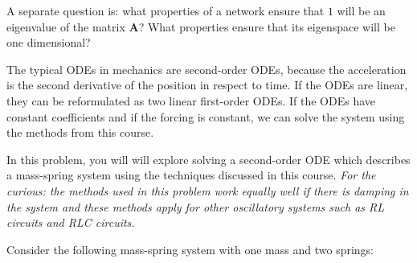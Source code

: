 \documentclass[10pt,answers]{exam}
\newcommand{\bA}{ \mathbf{A}}
\begin{document}
\begin{questions}
\begin{EnvUplevel}
  A separate question is: what properties of a network ensure that $1$ will be
  an eigenvalue of the matrix $\bA$?  What properties ensure that its eigenspace
  will be one dimensional?

\end{EnvUplevel}
  
\newpage 
     
\question \label{question:ODE} The typical ODEs in mechanics are second-order
ODEs, because the acceleration is the second derivative of the position in
respect to time. If the ODEs are linear, they can be reformulated as two linear
first-order ODEs.  If the ODEs have constant coefficients and if the forcing is
constant, we can solve the system using the methods from this course.
  
In this problem, you will will explore solving a second-order ODE which
describes a mass-spring system using the techniques discussed in this course.
\textit{For the curious: the methods used in this problem work equally well if
  there is damping in the system and these methods apply for other oscillatory
  systems such as RL circuits and RLC circuits.}

Consider the following mass-spring system with one mass and two springs:
\bigskip
  

\end{questions}
\end{document}
